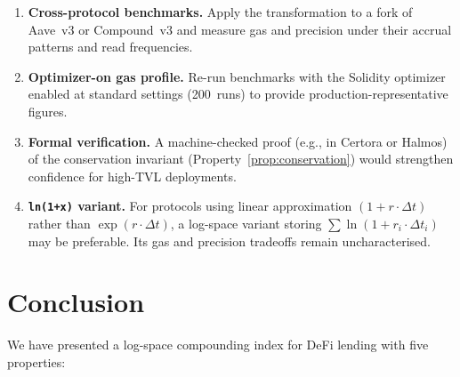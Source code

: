\documentclass[10pt,a4paper,twocolumn]{article}
\theoremstyle{definition}
\theoremstyle{plain}
\theoremstyle{remark}
\begin{document}
\begin{enumerate}[leftmargin=*, nosep]
\item \textbf{Cross-protocol benchmarks.} Apply the transformation to a fork of Aave~v3 or Compound~v3 and measure gas and precision under their accrual patterns and read frequencies.

\item \textbf{Optimizer-on gas profile.} Re-run benchmarks with the Solidity optimizer enabled at standard settings (200~runs) to provide production-representative figures.

\item \textbf{Formal verification.} A machine-checked proof (e.g., in Certora or Halmos) of the conservation invariant (Property~\ref{prop:conservation}) would strengthen confidence for high-TVL deployments.

\item \textbf{\texttt{ln(1+x)} variant.} For protocols using linear approximation $(1 + r \cdot \Delta t)$ rather than $\exp(r \cdot \Delta t)$, a log-space variant storing $\sum \ln(1 + r_i \cdot \Delta t_i)$ may be preferable. Its gas and precision tradeoffs remain uncharacterised.
\end{enumerate}

\section{Conclusion}
\label{sec:conclusion}

We have presented a log-space compounding index for DeFi lending with five properties:
\end{document}

